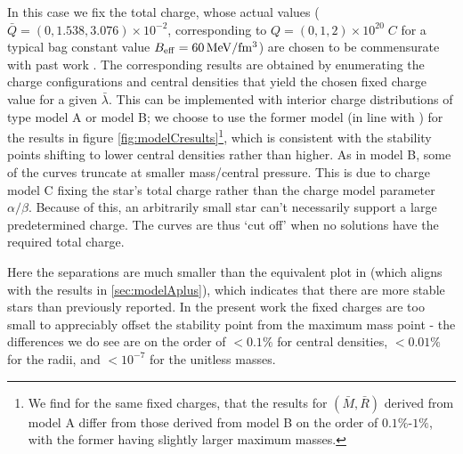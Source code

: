 \documentclass[12pt,noshowpacs,nofootinbib,notitlepage,amsmath,superscriptaddress]{revtex4-1}%
\newcommand{\mg}[1]{{\color{blue}\bf [Michael: #1]}}
\newcommand{\yb}[1]{{\color{orange}\bf [Yann: #1]}}
\begin{document}
In this case we fix the total charge, whose actual values ($\bar{Q}=(0, 1.538,3.076)\times 10^{-2}$, corresponding to $Q=(0,1, 2)\times 10^{20} \; \si{C}$ for a typical bag constant value $B_{\rm eff}=\rm 60\, MeV/fm^3$) are chosen to be commensurate with past work \cite{zhang:2021,Goncalves:2020joq}. The corresponding results are obtained by enumerating the charge configurations and central densities that yield the chosen fixed charge value for a given $\bar{\lambda}$. This can be implemented with interior charge distributions of type model A or model B; we choose to use the former model (in line with \cite{zhang:2021}) for the results in figure \ref{fig:modelCresults}\footnote{We find for the same fixed charges, that the results for $(\bar{M},\bar{R})$ derived from model A differ from those derived from model B on the order of $0.1\%$-$1\%$, with the former having slightly larger maximum masses.}, which is consistent with the stability points shifting to lower central densities rather than higher.  As in model B, some of the curves truncate at smaller mass/central pressure. This is due to charge model C fixing the star's total charge rather than the charge model parameter $\alpha / \beta$. Because of this, an arbitrarily small star can't necessarily support a large predetermined charge. The  curves are thus `cut off' when no solutions have the required total charge.

Here the separations are much smaller than the equivalent plot in \cite{zhang:2021} (which aligns with the results in \ref{sec:modelAplus}), which indicates that there are more stable stars  than previously reported. In the present work the fixed charges are too small to appreciably offset the stability point from the maximum mass point - the differences we do see are on the order of $<0.1\%$ for central densities, $<0.01\%$ for the radii, and $<10^{-7}$ for the unitless masses. 

\end{document}
